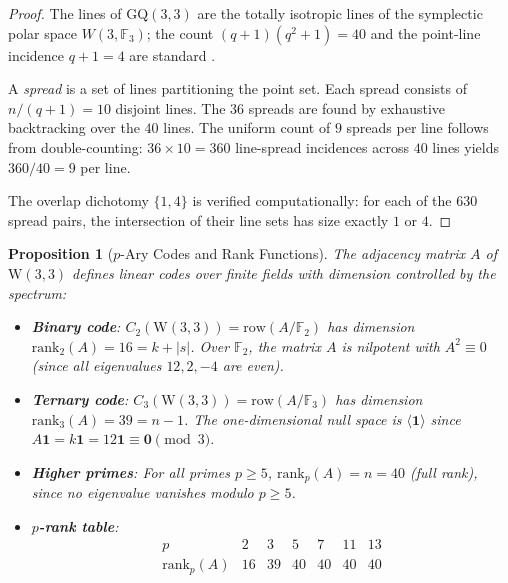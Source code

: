 \documentclass[12pt,a4paper]{article}
\newtheorem{proposition}[theorem]{Proposition}
\newcommand{\W}{\mathrm{W}(3,3)}
\begin{document}
\begin{proof}
The lines of $\mathrm{GQ}(3,3)$ are the totally isotropic lines of the symplectic
polar space $W(3, \mathbb{F}_3)$; the count $(q{+}1)(q^2{+}1) = 40$ and the
point-line incidence $q{+}1 = 4$ are standard \cite{PayneThas2009}.

A \emph{spread} is a set of lines partitioning the point set.  Each spread consists
of $n/(q{+}1) = 10$ disjoint lines.  The $36$ spreads are found by exhaustive
backtracking over the $40$ lines.  The uniform count of $9$ spreads per line
follows from double-counting: $36 \times 10 = 360$ line-spread incidences across
$40$ lines yields $360/40 = 9$ per line.

The overlap dichotomy $\{1, 4\}$ is verified computationally: for each of the
$630$ spread pairs, the intersection of their line sets has size exactly $1$ or $4$.
\end{proof}


\begin{proposition}[$p$-Ary Codes and Rank Functions]\label{prop:parycodes}
The adjacency matrix $A$ of $\W$ defines linear codes over finite fields
with dimension controlled by the spectrum:
\begin{itemize}
  \item \textbf{Binary code}: $C_2(\W) = \mathrm{row}(A / \mathbb{F}_2)$
        has dimension $\mathrm{rank}_2(A) = 16 = k + |s|$.
        Over $\mathbb{F}_2$, the matrix $A$ is nilpotent with $A^2 \equiv 0$
        (since all eigenvalues $12, 2, -4$ are even).
  \item \textbf{Ternary code}: $C_3(\W) = \mathrm{row}(A / \mathbb{F}_3)$
        has dimension $\mathrm{rank}_3(A) = 39 = n - 1$.
        The one-dimensional null space is $\langle \mathbf{1} \rangle$
        since $A \mathbf{1} = k \mathbf{1} = 12 \mathbf{1} \equiv \mathbf{0} \pmod{3}$.
  \item \textbf{Higher primes}: For all primes $p \ge 5$,
        $\mathrm{rank}_p(A) = n = 40$ (full rank), since no eigenvalue
        vanishes modulo $p \ge 5$.
  \item \textbf{$p$-rank table}:
        \[
          \begin{array}{c|cccccc}
            p & 2 & 3 & 5 & 7 & 11 & 13 \\
            \hline
            \mathrm{rank}_p(A) & 16 & 39 & 40 & 40 & 40 & 40
          \end{array}
        \]
\end{itemize}
\end{proposition}
\end{document}
